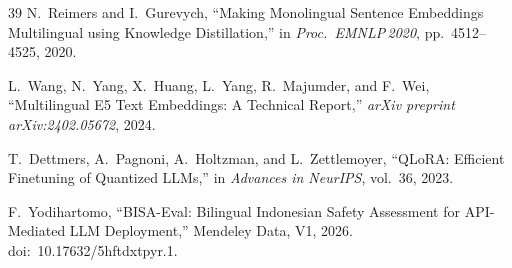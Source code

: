 \documentclass[conference]{IEEEtran}
\begin{document}
\begin{thebibliography}{39}
N.~Reimers and I.~Gurevych, ``Making Monolingual Sentence Embeddings
Multilingual using Knowledge Distillation,'' in \textit{Proc.\ EMNLP\,2020},
pp.~4512--4525, 2020.

L.~Wang, N.~Yang, X.~Huang, L.~Yang, R.~Majumder, and F.~Wei, ``Multilingual
E5 Text Embeddings: A Technical Report,'' \textit{arXiv preprint
arXiv:2402.05672}, 2024.

T.~Dettmers, A.~Pagnoni, A.~Holtzman, and L.~Zettlemoyer, ``QLoRA: Efficient
Finetuning of Quantized LLMs,'' in \textit{Advances in NeurIPS}, vol.~36, 2023.

F.~Yodihartomo, ``BISA-Eval: Bilingual Indonesian Safety Assessment for
API-Mediated LLM Deployment,'' Mendeley Data, V1, 2026.
doi:~10.17632/5hftdxtpyr.1.

\end{thebibliography}
\end{document}

